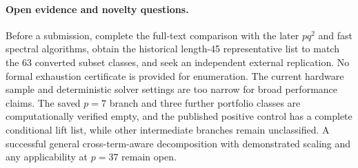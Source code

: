 \documentclass[11pt]{article}
\begin{document}
\paragraph{Open evidence and novelty questions.}
Before a submission, complete the full-text comparison with the later
$pq^2$ and fast spectral algorithms, obtain the historical length-45
representative list to match the 63 converted subset classes, and seek an
independent external replication. No formal exhaustion certificate is
provided for enumeration. The current hardware sample and deterministic
solver settings are too narrow for broad performance claims. The saved $p=7$
branch and three further portfolio classes are computationally verified
empty, and the published positive control has a complete conditional lift
list, while other intermediate branches
remain unclassified. A successful general
cross-term-aware decomposition with demonstrated scaling and any applicability
at $p=37$ remain open.
\end{document}
